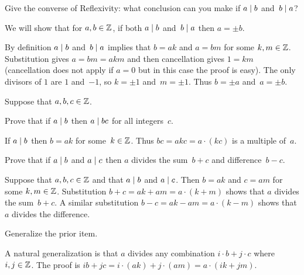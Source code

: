 \documentclass{test}  %
\begin{document}
\begin{problem}
Give the converse of Reflexivity: what conclusion can you make
if $a\mid b$ and~$b\mid a$?
\begin{ans}
We will show that for $a,b\in\mathbb{Z}$, if both $a\mid b$ and~$b\mid a$
then $a=\pm b$.

By definition $a\mid b$ and~$b\mid a$ implies that $b=ak$
and $a=bm$ for some $k,m\in\mathbb{Z}$.
Substitution gives $a=bm=akm$ and then cancellation gives $1=km$ (cancellation
does not apply if $a=0$ but in this case the proof is easy).
The only divisors of $1$ are $1$ and~$-1$, so $k=\pm 1$ and~$m=\pm 1$. 
Thus $b=\pm a$ and~$a=\pm b$.
\end{ans}
\end{problem}

\begin{problem} \label{ex:DividesAndLinearCombinations}
Suppose that $a,b,c\in\mathbb{Z}$.
\begin{exes}
\begin{exercise}
  Prove that if $a\mid b$ then $a\mid bc$ for all integers~$c$.
\end{exercise}
\begin{answer}
  If $a\mid b$ then $b=ak$ for some~$k\in\mathbb{Z}$.
  Thus $bc=akc=a\cdot(kc)$ is a multiple of~$a$.
\end{answer}
\begin{exercise}
  Prove that if $a\mid b$ and $a\mid c$ then $a$ divides the 
  sum~$b+c$ and difference~$b-c$.
\end{exercise}
\begin{answer}
  Suppose that $a,b,c\in\mathbb{Z}$ and that $a\mid b$ and $a\mid c$.
  Then $b=ak$ and $c=am$ for some $k,m\in\mathbb{Z}$. 
  Substitution  
  $b+c=ak+am=a\cdot(k+m)$
  shows that $a$ divides the sum~$b+c$.
  A similar substitution
  $b-c=ak-am=a\cdot(k-m)$
  shows that $a$ divides the difference.
\end{answer}
\begin{exercise}
   Generalize the prior item.
\end{exercise}
\begin{answer}
  A natural generalization is that $a$ divides any combination
  $i\cdot b+j\cdot c$ where $i,j\in\mathbb{Z}$.
  The proof is
  $ib+jc=i\cdot (ak)+j\cdot(am)=a\cdot(ik+jm)$.
\end{answer}
\end{exes}

\end{problem}
\end{document}
